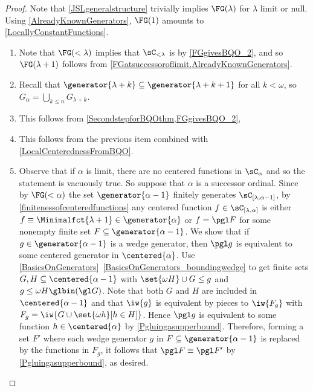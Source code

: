 \begin{proof}
Note that \cref{JSLgeneralstructure} trivially implies $\FG(\lambda)$ for $\lambda$ limit or null. Using \cref{AlreadyKnownGenerators}, $\FG(1)$ amounts to \cref{LocallyConstantFunctions}. 
\begin{enumerate}
\item Note that $\FG(< \lambda)$ implies that $\sC_{<\lambda}$ is \bqo{} by \cref{FGgivesBQO_2}, and so $\FG(\lambda+1)$ follows from \cref{FGatsuccessoroflimit,AlreadyKnownGenerators}. 
\item Recall that $\generator{\lambda+k}\subseteq \generator{\lambda+k+1}$ for all $k<\omega$, so $G_{\alpha}=\bigcup_{k\leq n} G_{\lambda+k}$.
\item This follows from \cref{SecondstepforBQOthm,FGgivesBQO_2}, 
\item This follows from the previous item combined with \cref{LocalCenterednessFromBQO}.
\item Observe that if $\alpha$ is limit, there are no centered functions in $\sC_\alpha$ and so the statement is vacuously true.
So suppose that $\alpha$ is a successor ordinal.
Since by $\FG(<\alpha)$ the set $\generator{\alpha-1}$ finitely generates $\sC_{[\lambda,\alpha-1]}$, by \cref{finitenessofcenteredfunctions} any centered function $f\in\sC_{[\lambda,\alpha]}$ is
either $f\equiv \Minimalfct{\lambda+1}\in \generator{\alpha}$ or $f=\pgl F$ for some nonempty finite set $F\subseteq\generator{\alpha-1}$.
We show that if $g\in \generator{\alpha-1}$ is a wedge generator, then $\pgl g$ is equivalent to some centered generator in $\centered{\alpha}$. Use \cref{BasicsOnGenerators}~\cref{BasicsOnGenerators_boundingwedge} to get finite sets $G, H\subseteq\centered{\alpha-1}$ with $ \set{\omega H}\cup G \leq g$ and $g\leq \omega H \glbin (\gl G)$.
Note that both $G$ and $H$ are included in $\centered{\alpha-1}$ and that $\iw{g}$ is equivalent by pieces to $\iw{F_g}$ with $F_g=\iw{G\cup\set{\omega h}[h\in H]}$. Hence $\pgl g$ is equivalent to some function $h\in\centered{\alpha}$ by \cref{Pgluingasupperbound}. 
Therefore, forming a set $F'$ where each wedge generator $g$ in $F\subseteq\generator{\alpha-1}$ is replaced by the functions in $F_g$, it follows that $\pgl F\equiv \pgl F'$ by \cref{Pgluingasupperbound},
as desired.    \qedhere
\end{enumerate}
\end{proof}


